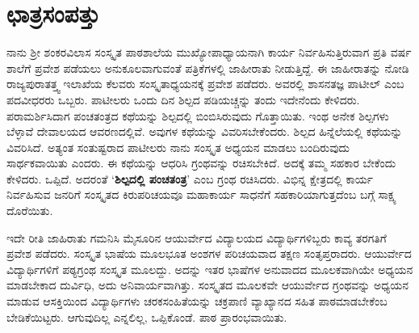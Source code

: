 \section*{ಛಾತ್ರಸಂಪತ್ತು}

ನಾನು ಶ್ರೀ ಶಂಕರವಿಲಾಸ ಸಂಸ್ಕೃತ ಪಾಠಶಾಲೆಯ ಮುಖ್ಯೋಪಾಧ್ಯಾಯನಾಗಿ ಕಾರ್ಯ ನಿರ್ವಹಿಸುತ್ತಿರುವಾಗ ಪ್ರತಿ ವರ್ಷ ಶಾಲೆಗೆ ಪ್ರವೇಶ ಪಡೆಯಲು ಅನುಕೂಲವಾಗುವಂತೆ ಪತ್ರಿಕೆಗಳಲ್ಲಿ ಜಾಹೀರಾತು ನೀಡುತ್ತಿದ್ದೆ.  ಈ ಜಾಹೀರಾತನ್ನು ನೋಡಿ ರಾಜ್ಯಪುರಾತತ್ತ್ವ ಇಲಾಖೆಯ ಕೆಲವರು ಸಂಸ್ಕೃತಾಧ್ಯಯನಕ್ಕೆ ಪ್ರವೇಶ ಪಡೆದರು.  ಅವರಲ್ಲಿ ಶಾಸನತಜ್ಞ ಪಾಟೀಲ್ ಎಂಬ ಪದವೀಧರರು ಒಬ್ಬರು.  ಪಾಟೀಲರು ಒಂದು ದಿನ ಶಿಲ್ಪದ ಪಡಿಯಚ್ಚನ್ನು ತಂದು ಇದೇನೆಂದು ಕೇಳಿದರು.  ಪರಾಮರ್ಶಿಸಿದಾಗ ಪಂಚತಂತ್ರದ ಕಥೆಯನ್ನು ಶಿಲ್ಪದಲ್ಲಿ ಬಿಂಬಿಸಿರುವುದು ಗೊತ್ತಾಯಿತು.  ಇಂಥ ಅನೇಕ ಶಿಲ್ಪಗಳು ಬೆಳ್ಳಾವೆ ದೇವಾಲಯದ ಆವರಣದಲ್ಲಿವೆ.  ಅವುಗಳ ಕಥೆಯನ್ನು ವಿವರಿಸಬೇಕೆಂದರು.  ಶಿಲ್ಪದ ಹಿನ್ನೆಲೆಯಲ್ಲಿ ಕಥೆಯನ್ನು ವಿವರಿಸಿದೆ.  ಅತ್ಯಂತ ಸಂತುಷ್ಟರಾದ ಪಾಟೀಲರು ನಾನು ಸಂಸ್ಕೃತ ಅಧ್ಯಯನ ಮಾಡಲು ಬಂದಿರುವುದು ಸಾರ್ಥಕವಾಯಿತು ಎಂದರು.  ಈ ಕಥೆಯನ್ನು ಆಧರಿಸಿ ಗ್ರಂಥವನ್ನು ರಚಿಸಬೇಕಿದೆ.  ಅದಕ್ಕೆ  ತಮ್ಮ ಸಹಕಾರ ಬೇಕೆಂದು ಕೇಳಿದರು. ಒಪ್ಪಿದೆ.  ಅದರಂತೆ  ‘\textbf{ಶಿಲ್ಪದಲ್ಲಿ ಪಂಚತಂತ್ರ}’ ಎಂಬ ಗ್ರಂಥ ರಚಿಸಿದರು. ವಿಭಿನ್ನ ಕ್ಷೇತ್ರದಲ್ಲಿ ಕಾರ್ಯ ನಿರ್ವಹಿಸುವ ಜನರಿಗೆ ಸಂಸ್ಕೃತದ ಕಿರುಪರಿಚಯವೂ ಮಹಾಕಾರ್ಯ ಸಾಧನೆಗೆ ಸಹಕಾರಿಯಾಗುತ್ತದೆಂಬ ಬಗ್ಗೆ ಸಾಕ್ಷ್ಯ ದೊರೆಯಿತು.  

ಇದೇ ರೀತಿ ಜಾಹಿರಾತು ಗಮನಿಸಿ ಮೈಸೂರಿನ ಆಯುರ್ವೇದ ವಿದ್ಯಾಲಯದ ವಿದ್ಯಾರ್ಥಿಗಳಿಬ್ಬರು ಕಾವ್ಯ ತರಗತಿಗೆ ಪ್ರವೇಶ ಪಡೆದರು.  ಸಂಸ್ಕೃತ ಭಾಷೆಯ ಮೂಲಭೂತ ಅಂಶಗಳ ಪರಿಚಯವಾದ ತಕ್ಷಣ ಸಂತೃಪ್ತರಾದರು.  ಆಯುರ್ವೇದ ವಿದ್ಯಾರ್ಥಿಗಳಿಗೆ ಪಠ್ಯಗ್ರಂಥ ಸಂಸ್ಕೃತ ಮೂಲದ್ದು.   ಅದನ್ನು ಇತರ ಭಾಷೆಗಳ ಅನುವಾದದ ಮೂಲಕವಾಗಿಯೇ ಅಧ್ಯಯನ ಮಾಡಬೇಕಾದ ದುರ್ವಿಧಿ, ಅದು ಅನಿವಾರ್ಯವಾಗಿತ್ತು. ಸಂಸ್ಕೃತದ ಮೂಲಕವೇ ಆಯುರ್ವೇದ ಗ್ರಂಥವನ್ನು ಅಧ್ಯಯನ ಮಾಡುವ ಆಸಕ್ತಿಯಿಂದ ವಿದ್ಯಾರ್ಥಿಗಳು ಚರಕಸಂಹಿತೆಯನ್ನು ಚಕ್ರಪಾಣಿ ವ್ಯಾಖ್ಯಾನದ ಸಹಿತ ಪಾಠಮಾಡಬೇಕೆಂಬ ಬೇಡಿಕೆಯಿಟ್ಟರು. ಆಗುವುದಿಲ್ಲ ಎನ್ನಲಿಲ್ಲ,  ಒಪ್ಪಿಕೊಂಡೆ.  ಪಾಠ ಪ್ರಾರಂಭವಾಯಿತು.

